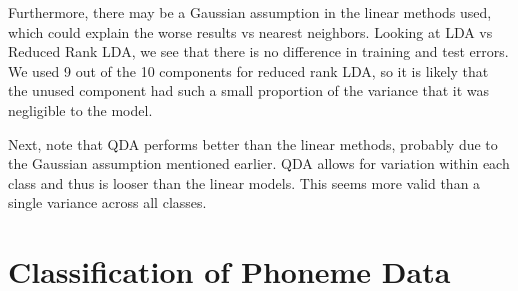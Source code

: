 \documentclass[a4paper,10pt]{article}
\begin{document}
Furthermore, there may be a Gaussian assumption in the linear methods used, 
which could explain the worse results vs nearest neighbors. Looking at
LDA vs Reduced Rank LDA, we see that there is no difference in training and
test errors. We used 9 out of the 10 components for reduced rank LDA, so 
it is likely that the unused component had such a small proportion of the 
variance that it was negligible to the model.

Next, note that QDA performs better than the linear methods, probably due to
the Gaussian assumption mentioned earlier. QDA allows for variation within
each class and thus is looser than the linear models. This seems more
valid than a single variance across all classes.

\section{Classification of Phoneme Data}
\end{document}
